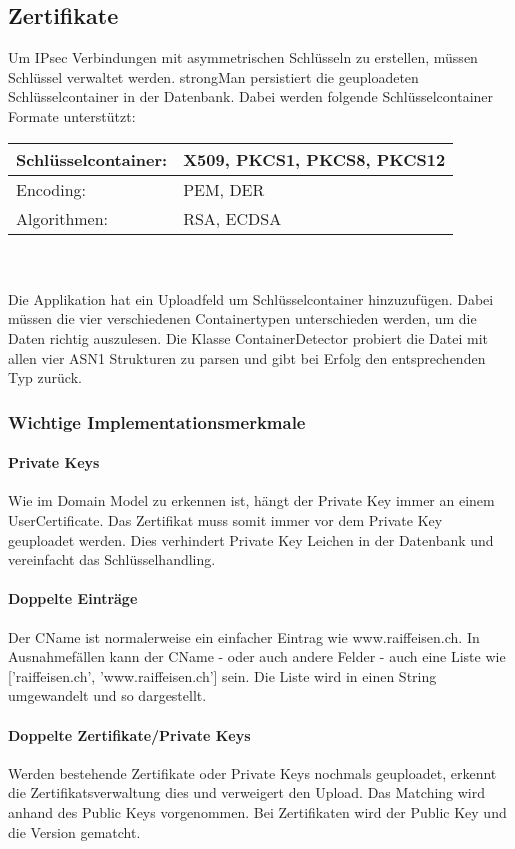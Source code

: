 \subsection{Zertifikate}
Um IPsec Verbindungen mit asymmetrischen Schlüsseln zu erstellen, müssen Schlüssel verwaltet werden. strongMan persistiert die geuploadeten Schlüsselcontainer in der Datenbank.
Dabei werden folgende Schlüsselcontainer Formate unterstützt: \\

\begin{tabular}{ | p{} | p{} | }
\hline
    Schlüsselcontainer: & X509, PKCS1, PKCS8, PKCS12 \\ \hline
    Encoding: & PEM, DER \\ \hline
    Algorithmen: & RSA, ECDSA \\ \hline
\end{tabular}
\\\\
Die Applikation hat ein Uploadfeld um Schlüsselcontainer hinzuzufügen. Dabei müssen die vier verschiedenen Containertypen unterschieden werden, um die Daten richtig auszulesen. Die Klasse ContainerDetector probiert die Datei mit allen vier ASN1 Strukturen zu parsen und gibt bei Erfolg den entsprechenden Typ zurück.

\subsubsection{Wichtige Implementationsmerkmale}
\paragraph{Private Keys} Wie im Domain Model zu erkennen ist, hängt der Private Key immer an einem UserCertificate. Das Zertifikat muss somit immer vor dem Private Key geuploadet werden. Dies verhindert Private Key Leichen in der Datenbank und vereinfacht das Schlüsselhandling.

\paragraph{Doppelte Einträge} Der CName ist normalerweise ein einfacher Eintrag wie www.raiffeisen.ch. In Ausnahmefällen kann der CName - oder auch andere Felder - auch eine Liste wie ['raiffeisen.ch', 'www.raiffeisen.ch'] sein. Die Liste wird in einen String umgewandelt und so dargestellt.

\paragraph{Doppelte Zertifikate/Private Keys}
Werden bestehende Zertifikate oder Private Keys nochmals geuploadet, erkennt die Zertifikatsverwaltung dies und verweigert den Upload. Das Matching wird anhand des Public Keys vorgenommen. Bei Zertifikaten wird der Public Key und die Version gematcht.




